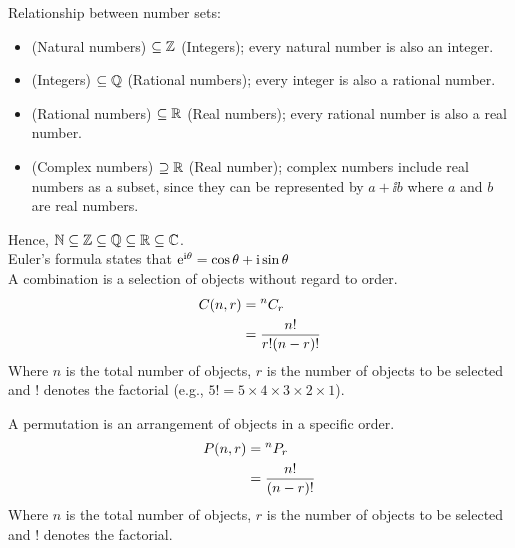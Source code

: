 \documentclass[a4paper,11pt,twoside]{article}
\begin{document}
\begin{center}
    \begin{minipage}{0.7\textwidth}
        Relationship between number sets:
        \begin{itemize}
          \item \N{} (Natural numbers) $\subseteq \mathbb{Z}$ (Integers); every natural number is also an integer.
          \item \Z{} (Integers) $\subseteq \mathbb{Q}$ (Rational numbers); every integer is also a rational number.
          \item \Q{} (Rational numbers) $\subseteq \mathbb{R}$ (Real numbers); every rational number is also a real number.
          \item \Complex{} (Complex numbers) $\supseteq \mathbb{R}$ (Real number); complex numbers include real numbers as a subset, since they can be represented by $a+\ii b$ where $a$ and $b$ are real numbers.
        \end{itemize}
        Hence, $\mathbb{N}\subseteq\mathbb{Z}\subseteq\mathbb{Q}\subseteq\mathbb{R}\subseteq\mathbb{C}$.\\[0.5cm]
        
        Euler's formula states that $\mathrm{e}^{\mathrm{i}\theta} = \cos\theta + \mathrm{i}\sin\theta$\\[0.5cm]
        
        A combination is a selection of objects without regard to order.
    	\begin{align}
        	C(n,r) &= {}^{n}C_{r}\\
        	&= \frac{n!}{r!(n-r)!}
        \end{align}
        Where $n$ is the total number of objects, $r$ is the number of objects to be selected and $!$ denotes the factorial (e.g., $5! = 5\times4\times3\times2\times1$).
        
        A permutation is an arrangement of objects in a specific order.
        \begin{align}
        	P(n,r) &= {}^{n}P_{r}\\
        	&= \frac{n!}{(n-r)!}
        \end{align}
        Where $n$ is the total number of objects, $r$ is the number of objects to be selected and $!$ denotes the factorial.
    \end{minipage}
\end{center}
\end{document}
